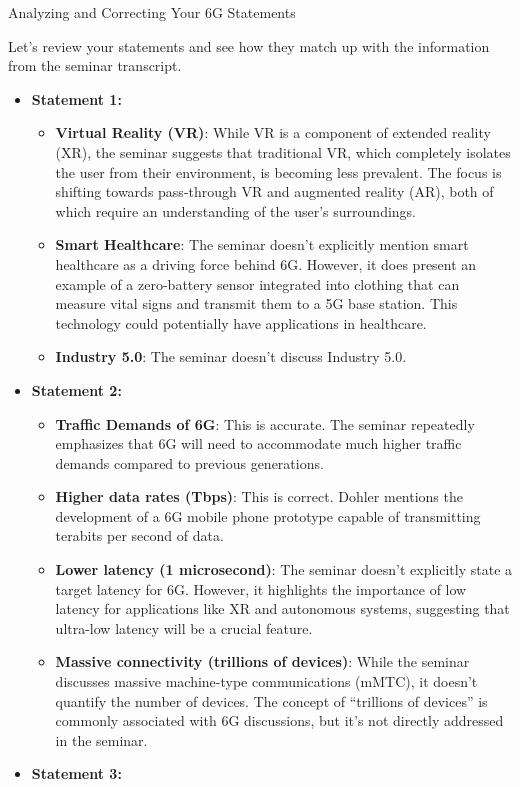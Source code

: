 \documentclass[
]{article}
\author{}
\date{}
\begin{document}
{Analyzing and Correcting Your 6G
Statements}\label{analyzing-and-correcting-your-6g-statements}

Let's review your statements and see how they match up with the
information from the seminar transcript.

\begin{itemize}
\item
  \textbf{Statement 1:}

  \begin{itemize}
  
  \item
    \textbf{Virtual Reality (VR)}: While VR is a component of extended
    reality (XR), the seminar suggests that traditional VR, which
    completely isolates the user from their environment, is becoming
    less prevalent. The focus is shifting towards pass-through VR and
    augmented reality (AR), both of which require an understanding of
    the user's surroundings.
  \item
    \textbf{Smart Healthcare}: The seminar doesn't explicitly mention
    smart healthcare as a driving force behind 6G. However, it does
    present an example of a zero-battery sensor integrated into clothing
    that can measure vital signs and transmit them to a 5G base station.
    This technology could potentially have applications in healthcare.
  \item
    \textbf{Industry 5.0}: The seminar doesn't discuss Industry 5.0.
  \end{itemize}
\item
  \textbf{Statement 2:}

  \begin{itemize}
  
  \item
    \textbf{Traffic Demands of 6G}: This is accurate. The seminar
    repeatedly emphasizes that 6G will need to accommodate much higher
    traffic demands compared to previous generations.
  \item
    \textbf{Higher data rates (Tbps)}: This is correct. Dohler mentions
    the development of a 6G mobile phone prototype capable of
    transmitting terabits per second of data.
  \item
    \textbf{Lower latency (1 microsecond)}: The seminar doesn't
    explicitly state a target latency for 6G. However, it highlights the
    importance of low latency for applications like XR and autonomous
    systems, suggesting that ultra-low latency will be a crucial
    feature.
  \item
    \textbf{Massive connectivity (trillions of devices)}: While the
    seminar discusses massive machine-type communications (mMTC), it
    doesn't quantify the number of devices. The concept of ``trillions
    of devices'' is commonly associated with 6G discussions, but it's
    not directly addressed in the seminar.
  \end{itemize}
\item
  \textbf{Statement 3:}


\end{itemize}
\end{document}
